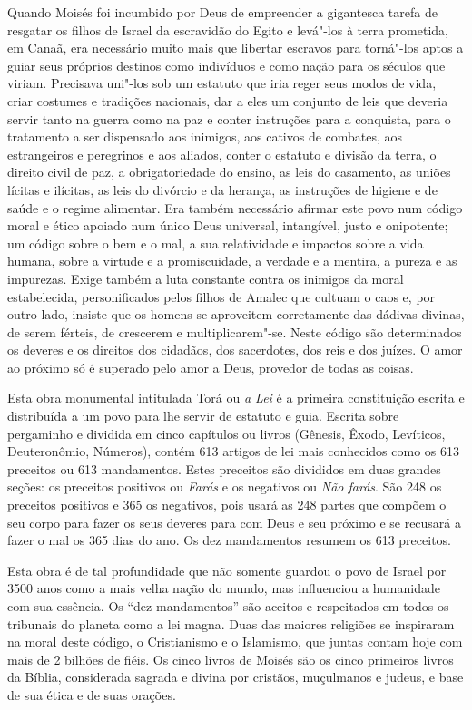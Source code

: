 Quando Moisés foi incumbido por Deus de empreender a gigantesca tarefa de resgatar os filhos de Israel da escravidão do Egito e levá"-los à terra prometida, em Canaã, era necessário muito mais que libertar escravos para torná"-los aptos a guiar seus próprios destinos como indivíduos e como nação para os séculos que viriam. Precisava uni"-los sob um estatuto que iria reger seus modos de vida, criar costumes e tradições nacionais, dar a eles um conjunto de leis que deveria servir tanto na guerra como na paz e conter instruções para a conquista, para o tratamento a ser dispensado aos inimigos, aos cativos de combates, aos estrangeiros e peregrinos e aos aliados, conter o estatuto e divisão da terra, o direito civil de paz, a obrigatoriedade do ensino, as leis do casamento, as uniões lícitas e ilícitas, as leis do divórcio e da herança, as instruções de higiene e de saúde e o regime alimentar. Era também necessário afirmar este povo num código moral e ético apoiado num único Deus universal, intangível, justo e onipotente; um código sobre o bem e o mal, a sua relatividade e impactos sobre a vida humana, sobre a virtude e a promiscuidade, a verdade e a mentira, a pureza e as impurezas. Exige também a luta constante contra os inimigos da moral estabelecida, personificados pelos filhos de Amalec que cultuam o caos e, por outro lado, insiste que os homens se aproveitem corretamente das dádivas divinas, de serem férteis, de crescerem e multiplicarem"-se. Neste código são determinados os deveres e os direitos dos cidadãos, dos sacerdotes, dos reis e dos juízes. O amor ao próximo só é superado pelo amor a Deus, provedor de todas as coisas.

Esta obra monumental intitulada Torá ou \emph{a Lei} é a
primeira constituição escrita e distribuída a um povo para lhe servir
de estatuto e guia. Escrita sobre pergaminho e dividida em cinco capítulos
ou livros (Gênesis, Êxodo, Levíticos, Deuteronômio, Números), contém 613
artigos de lei mais conhecidos como os 613 preceitos ou 613 mandamentos.
Estes preceitos são divididos em duas grandes seções: os preceitos
positivos ou \emph{Farás} e os negativos ou \emph{Não farás}. São 248 os
preceitos positivos e 365 os negativos, pois usará as 248 partes que
compõem o seu corpo para fazer os seus deveres para com Deus e seu
próximo e se recusará a fazer o mal os 365 dias do ano. Os dez
mandamentos resumem os 613 preceitos.

Esta obra é de tal profundidade que não somente guardou o povo de Israel
por 3500 anos como a mais velha nação do mundo, mas influenciou a
humanidade com sua essência. Os ``dez mandamentos'' são aceitos e
respeitados em todos os tribunais do planeta como a lei magna. Duas das
maiores religiões se inspiraram na moral deste código, o Cristianismo e
o Islamismo, que juntas contam hoje com mais de 2 bilhões de fiéis. Os
cinco livros de Moisés são os cinco primeiros livros da Bíblia,
considerada sagrada e divina por cristãos, muçulmanos e judeus,
e base de sua ética e de suas orações.

